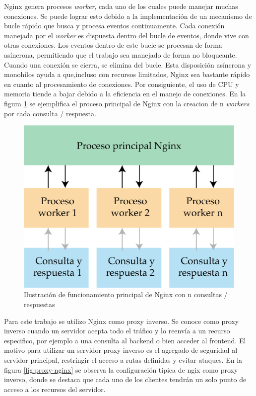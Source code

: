Nginx genera procesos \textit{worker}, cada uno de los cuales puede manejar muchas conexiones. Se puede lograr esto debido a la implementación de un mecanismo de bucle rápido que busca y procesa eventos continuamente. Cada conexión manejada por el \textit{worker} es dispuesta dentro del bucle de eventos, donde vive con otras conexiones. Los eventos dentro de este bucle se procesan de forma asíncrona, permitiendo que el trabajo sea manejado de forma no bloqueante. Cuando una conexión se cierra, se elimina del bucle. Esta disposición asíncrona y monohilos ayuda a que,incluso con recursos limitados, Nginx sea bastante rápido en cuanto al procesamiento de conexiones. Por consiguiente, el uso de CPU y memoria tiende a bajar debido a la eficiencia en el manejo de conexiones. En la figura  \ref{fig:worker-nginx} se ejemplifica el proceso principal de Nginx con la creacion de n \textit{workers} por cada consulta / respuesta.

\begin{figure}[htpb]
	\centering
	\includegraphics[scale=.7]{./Figures/worker-nginx.png}
	\caption[Proceso principal Nginx ]{Ilustración de funcionamiento principal de Nginx con n consultas / respuestas}
	\label{fig:worker-nginx}
\end{figure}

Para este trabajo se utilizo Nginx como proxy inverso. Se conoce como proxy inverso cuando un servidor acepta todo el tráfico y lo reenvía a un recurso especifico, por ejemplo a una consulta al backend o bien acceder al frontend. El motivo para utilizar un servidor proxy inverso es el agregado de seguridad al servidor principal,  restringir el acceso a rutas definidas y evitar ataques. En la figura \ref{fig:proxy-nginx}  se observa la configuración típica de ngix como proxy inverso, donde se destaca que cada uno de los clientes tendrán un solo punto de acceso a los recursos del servidor. 

